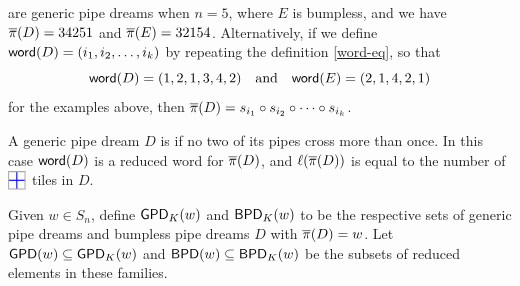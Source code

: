 \documentclass[10pt]{article}
\begin{document}
\ee
are generic pipe dreams when $n=5$, where $E$ is bumpless,
and we have $\overline{\pi}(D)=34251$ and $\overline{\pi}(E)=32154$.
Alternatively, 
if we define $\mathsf{word}(D) = (i_1,i_2,\dots,i_k)$ by repeating the definition \eqref{word-eq}, so that  
\[\mathsf{word}(D) = (1, 2, 1, 3, 4, 2)
\quad\text{and}\quad
\mathsf{word}(E)=(2, 1, 4, 2, 1)\]
for the examples above, then 
 $\overline{\pi}(D)  = s_{i_1} \circ s_{i_2}\circ \cdots \circ s_{i_k}$.
 
 A generic pipe dream $D$ is  if no two of its pipes  cross more than once.
 In this case $\mathsf{word}(D)$ is a reduced word for $\overline{\pi}(D)$, and 
$\ell(\overline{\pi}(D))$ is equal to the number of $\PTILE$ tiles in $D$.

 \begin{definition}
Given $w \in S_n$,  define 
$ \mathsf{GPD}_K(w)$ and $ \mathsf{BPD}_K(w)$
to be the respective sets of   generic pipe dreams and  bumpless pipe dreams $D$ with $\overline{\pi}(D)=w$.
Let $\mathsf{GPD}(w)\subseteq  \mathsf{GPD}_K(w)$ and $\mathsf{BPD}(w)\subseteq  \mathsf{BPD}_K(w)$ be the subsets of reduced elements in these families.
\end{definition}
\end{document}
